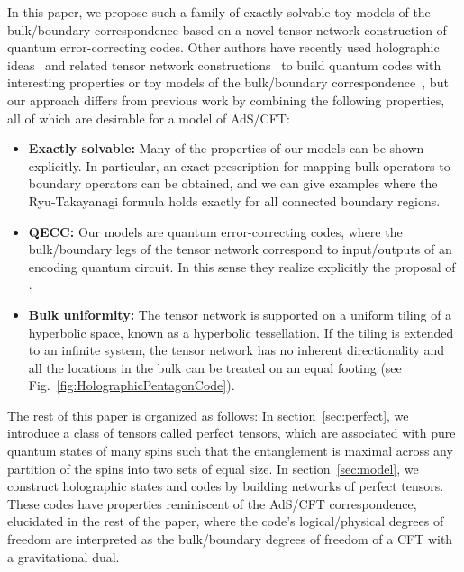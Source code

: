\documentclass[12pt]{article}
\newcommand{\tb}[1]{\textbf{#1}}
\theoremstyle{plain}
\theoremstyle{plain}
\theoremstyle{plain}
\theoremstyle{plain}
\theoremstyle{result}
\theoremstyle{remark}
\theoremstyle{conjecture}
\theoremstyle{observation}
\theoremstyle{definition}
\theoremstyle{corollary}
\theoremstyle{definition}
\theoremstyle{definition}
\theoremstyle{assumption}
\theoremstyle{definition}
\theoremstyle{problem}
\theoremstyle{fact}
\begin{document}
In this paper, we propose such a family of exactly solvable toy models of the bulk/boundary correspondence based on a novel tensor-network construction of quantum error-correcting codes. Other authors have recently used holographic ideas~\cite{Yoshida2013,Latorre2015} and related tensor network constructions~\cite{Ferris14,Bacon14} to build quantum codes with interesting properties or toy models of the bulk/boundary correspondence~\cite{Qi13}, but our approach differs from previous work by combining the following properties, all of which are desirable for a model of AdS/CFT: 

\begin{itemize}
\item \tb{Exactly solvable:} Many of the properties of our models can be shown explicitly.  In particular, an exact prescription for mapping bulk operators to boundary operators can be obtained, and we can give examples where the Ryu-Takayanagi formula holds exactly for all connected boundary regions.
 
\item \tb{QECC:} Our models are quantum error-correcting codes, where the bulk/boundary legs of the tensor network correspond to input/outputs of an encoding quantum circuit. In this sense they realize explicitly the proposal of \cite{Almheiri14}. 

\item \tb{Bulk uniformity:} The tensor network is supported on a uniform tiling of a hyperbolic space, known as a hyperbolic tessellation. If the tiling is extended to an infinite system, the tensor network has no inherent directionality and all the locations in the bulk can be treated on an equal footing (see Fig.~\ref{fig:HolographicPentagonCode}). 
\end{itemize}

The rest of this paper is organized as follows: In section~\ref{sec:perfect}, we introduce a class of tensors called perfect tensors, which are associated with pure quantum states of many spins such that the entanglement is maximal across any partition of the spins into two sets of equal size. In section~\ref{sec:model}, we construct holographic states and codes by building networks of perfect tensors. These codes have properties reminiscent of the AdS/CFT correspondence, elucidated in the rest of the paper, where the code's logical/physical degrees of freedom are interpreted as the bulk/boundary degrees of freedom of a CFT with a gravitational dual. 
\end{document}

